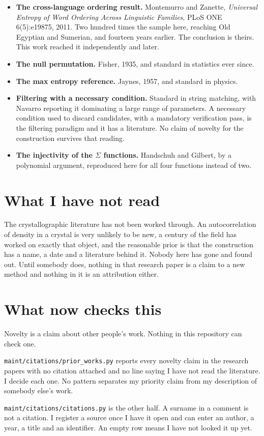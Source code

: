 \begin{itemize}
  \item \textbf{The cross-language ordering result.} Montemurro and Zanette,
    \emph{Universal Entropy of Word Ordering Across Linguistic Families}, PLoS ONE 6(5):e19875, 2011.
    Two hundred times the sample here, reaching Old Egyptian and Sumerian, and fourteen years
    earlier. The conclusion is theirs. This work reached it independently and later.
  \item \textbf{The null permutation.} Fisher, 1935, and standard in statistics ever since.
  \item \textbf{The max entropy reference.} Jaynes, 1957, and standard in physics.
  \item \textbf{Filtering with a necessary condition.} Standard in string matching, with Navarro
    reporting it dominating a large range of parameters. A necessary condition used to discard
    candidates, with a mandatory verification pass, is the filtering paradigm and it has a
    literature. No claim of novelty for the construction survives that reading.
  \item \textbf{The injectivity of the $\Sigma$ functions.} Handschuh and Gilbert, by a polynomial
    argument, reproduced here for all four functions instead of two.
\end{itemize}

\section*{What I have not read}

The crystallographic literature has not been worked through. An autocorrelation of density in a
crystal is very unlikely to be new, a century of the field has worked on exactly that object, and
the reasonable prior is that the construction has a name, a date and a literature behind it. Nobody
here has gone and found out. Until somebody does, nothing in that research paper is a claim to a new method
and nothing in it is an attribution either.

\section*{What now checks this}

Novelty is a claim about other people's work. Nothing in this repository can check one.

\texttt{maint/\allowbreak{}citations/\allowbreak{}prior\_\allowbreak{}works.\allowbreak{}py} reports
every novelty claim in the research papers with no citation attached and no line saying I have not read the
literature. I decide each one. No pattern separates my priority claim from my description of
somebody else's work.

\texttt{maint/\allowbreak{}citations/\allowbreak{}citations.\allowbreak{}py} is the other half. A
surname in a comment is not a citation. I register a source once I have it open and can enter an
author, a year, a title and an identifier. An empty row means I have not looked it up yet.
\cleardoublepage
